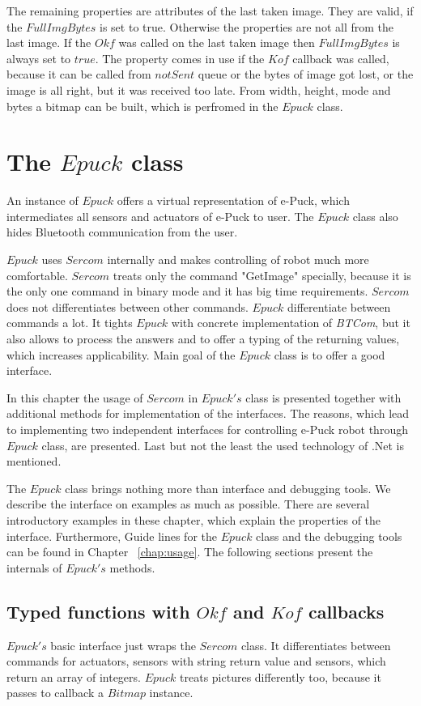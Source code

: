   The remaining properties are attributes of the last taken image. They are valid, if the $FullImgBytes$ is set to true.
  Otherwise the properties are not all from the last image.
  If the $Okf$ was called on the last taken image then $FullImgBytes$ is always set to $true$. The property
  comes in use if the $Kof$ callback was called, because it can be called from $notSent$ queue 
  or the bytes of image got lost, or the image is all right, but it was received too late. 
  From width, height, mode and bytes a bitmap can be built, which is perfromed
  in the $Epuck$ class.

\section{The $Epuck$ class} \label{sec:epuck}
  An instance of $Epuck$ offers a virtual representation of e-Puck,
  which intermediates all sensors and actuators of e-Puck to user. 
  The $Epuck$ class also hides Bluetooth communication from the user.

  $Epuck$ uses $Sercom$ internally and makes controlling of robot much more comfortable.
  $Sercom$ treats only the command "GetImage" specially, because it is the only one command in binary mode
  and it has big time requirements. $Sercom$ does not differentiates between other commands.
  $Epuck$ differentiate between commands a lot. It tights $Epuck$ with concrete implementation of {\it BTCom},
  but it also allows to process the answers and to offer a typing of the returning values, which increases
  applicability. Main goal of the $Epuck$ class is to offer a good interface.

  In this chapter the usage of $Sercom$ in $Epuck's$ class is presented together with additional methods 
  for implementation of the interfaces. The reasons, which lead to implementing two independent interfaces for
  controlling e-Puck robot through $Epuck$ class, are presented.
  Last but not the least the used technology of .Net is mentioned.

  The $Epuck$ class brings nothing more than interface and debugging tools. We describe the interface
  on examples as much as possible. There are several introductory examples in these chapter,
  which explain the properties of the interface. Furthermore, 
  Guide lines for the $Epuck$ class and the debugging
  tools can be found in Chapter ~\ref{chap:usage}.
  The following sections present the internals of $Epuck's$ methods.
  
\subsection{Typed functions with $Okf$ and $Kof$ callbacks} \label{sec:okfkofi}
  $Epuck's$ basic interface just wraps the $Sercom$ class. It differentiates between
  commands for actuators, sensors with string return value and sensors, which return an array of integers.
  $Epuck$ treats pictures differently too, because it passes to callback a $Bitmap$ instance.


